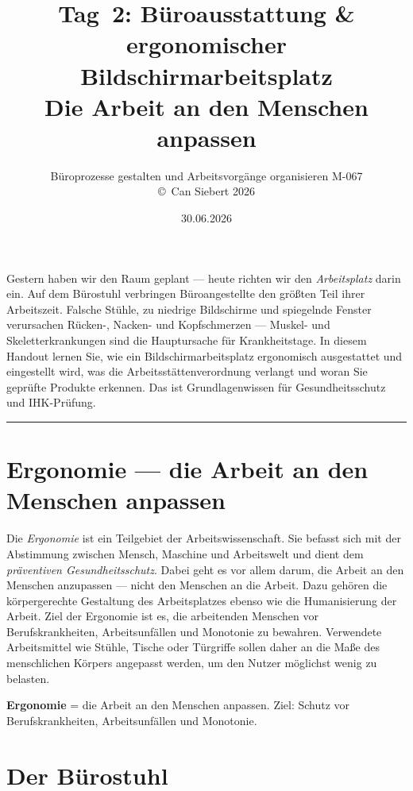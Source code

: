 \documentclass[11pt, a4paper]{article}
\title{\vspace*{-1.5cm}\Huge\bfseries\color{bfwPrimaryDark}Tag~2: Büroausstattung \& ergonomischer Bildschirmarbeitsplatz\\[0.4em]
  \large\color{bfwInkSoft}\textnormal{Die Arbeit an den Menschen anpassen}}
\author{\textsf{Büroprozesse gestalten und Arbeitsvorgänge organisieren \textperiodcentered{} M-067}\\
\textsf{\small\copyright\ Can Siebert\,\textperiodcentered\,2026}}
\date{30.06.2026}
\begin{document}
\maketitle
\thispagestyle{empty}

\vspace{1em}
\begin{merksatz}[title={\bfseries Worum geht es heute?}]
Gestern haben wir den Raum geplant --- heute richten wir den \emph{Arbeitsplatz} darin ein.
Auf dem Bürostuhl verbringen Büroangestellte den größten Teil ihrer Arbeitszeit. Falsche
Stühle, zu niedrige Bildschirme und spiegelnde Fenster verursachen Rücken-, Nacken- und
Kopfschmerzen --- Muskel- und Skeletterkrankungen sind die Hauptursache für Krankheitstage.
In diesem Handout lernen Sie, wie ein Bildschirmarbeitsplatz ergonomisch ausgestattet und
eingestellt wird, was die Arbeitsstättenverordnung verlangt und woran Sie geprüfte
Produkte erkennen. Das ist Grundlagenwissen für Gesundheitsschutz und IHK-Prüfung.
\end{merksatz}

\tableofcontents
\vspace{1em}
\hrule
\vspace{1em}

\section{Ergonomie --- die Arbeit an den Menschen anpassen}

Die \emph{Ergonomie} ist ein Teilgebiet der Arbeitswissenschaft. Sie befasst sich mit der
Abstimmung zwischen Mensch, Maschine und Arbeitswelt und dient dem \emph{präventiven
Gesundheitsschutz}. Dabei geht es vor allem darum, die Arbeit an den Menschen anzupassen ---
nicht den Menschen an die Arbeit. Dazu gehören die körpergerechte Gestaltung des
Arbeitsplatzes ebenso wie die Humanisierung der Arbeit. Ziel der Ergonomie ist es, die
arbeitenden Menschen vor Berufskrankheiten, Arbeitsunfällen und Monotonie zu bewahren.
Verwendete Arbeitsmittel wie Stühle, Tische oder Türgriffe sollen daher an die Maße des
menschlichen Körpers angepasst werden, um den Nutzer möglichst wenig zu belasten.

\begin{merksatz}
\textbf{Ergonomie} = die Arbeit an den Menschen anpassen. Ziel: Schutz vor
Berufskrankheiten, Arbeitsunfällen und Monotonie.
\end{merksatz}

\section{Der Bürostuhl}
\end{document}
